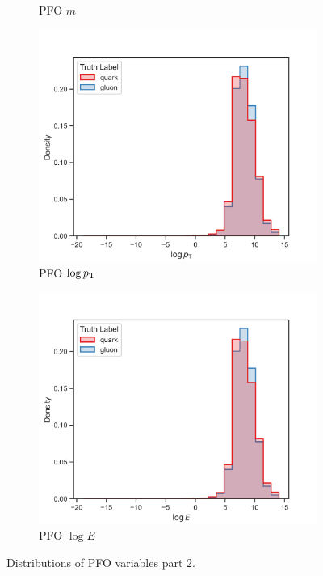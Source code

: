 \begin{figure}[!htb]
\begin{subfigure}[t]{0.45\textwidth}
        \caption{PFO $m$}
        \label{fig:app_pfo_m}
    \end{subfigure}
    \begin{subfigure}[t]{0.45\textwidth}
        \includegraphics[width=\linewidth]{src/plots/distributions/PFOs/log_pT.png}
        \caption{PFO $\log p_\text{T}$}
        \label{fig:app_pfo_log_pT}
    \end{subfigure}
    \begin{subfigure}[t]{0.45\textwidth}
        \includegraphics[width=\linewidth]{src/plots/distributions/PFOs/log_E.png}
        \caption{PFO $\log E$}
        \label{fig:app_pfo_log_E}
    \end{subfigure}
\caption{Distributions of PFO variables part 2.}
\label{fig:app_pfo_variables_2}
\end{figure}

